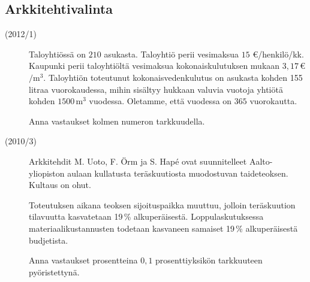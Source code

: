 \subsection*{Arkkitehtivalinta}

\begin{description}
    \item[(2012/1)] Taloyhtiössä on $210$ asukasta. Taloyhtiö perii vesimaksua
        $15$ \euro/henkilö/kk. Kaupunki perii taloyhtiöltä vesimaksua
        kokonaiskulutuksen mukaan $3,17$\,\euro $/ \mathrm{m}^3$.
        Taloyhtiön toteutunut kokonaisvedenkulutus on asukasta kohden
        155 litraa vuorokaudessa, mihin sisältyy hukkaan valuvia
        vuotoja yhtiötä kohden $1500\,\mathrm{m}^3$ vuodessa. Oletamme,
        että vuodessa on $365$ vuorokautta.
                    
    \begin{alakohdat}
    \end{alakohdat}
    
    Anna vastaukset kolmen numeron tarkkuudella.
\end{description}


\begin{description}
    \item[(2010/3)] Arkkitehdit M. Uoto, F. Örm ja S. Hapé ovat suunnitelleet Aalto-yliopiston aulaan kullatusta teräskuutiosta muodostuvan taideteoksen. Kultaus on ohut.
    
    Toteutuksen aikana teoksen sijoituspaikka muuttuu, jolloin teräskuution tilavuutta kasvatetaan 19\,\% alkuperäisestä. Loppulaskutuksessa materiaalikustannusten todetaan kasvaneen samaiset 19\,\% alkuperäisestä budjetista.                   
    \begin{alakohdat}
    \end{alakohdat}
    
    Anna vastaukset prosentteina $0,1$ prosenttiyksikön tarkkuuteen pyöristettynä.
\end{description}

